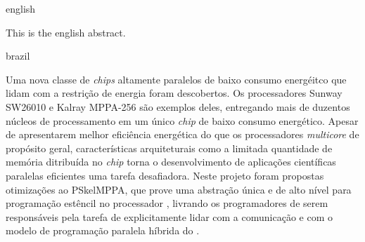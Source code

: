 \swapcontents
{
    \begin{otherlanguage*}{english}
    \begin{resumo}[Abstract]

        This is the english abstract.


    \end{resumo}
    \end{otherlanguage*}
}
{
    \begin{otherlanguage*}{brazil}
    \begin{resumo}[Resumo]

        Uma nova classe de \textit{chips} altamente paralelos de baixo consumo energéitco que lidam com a restrição de energia foram descobertos. Os processadores Sunway SW26010 e Kalray MPPA-256 são exemplos deles, entregando mais de duzentos núcleos de processamento em um único \textit{chip} de baixo consumo energético. Apesar de apresentarem melhor eficiência energética do que os processadores \textit{multicore} de propósito geral, características arquiteturais como a limitada quantidade de memória ditribuída no \textit{chip} torna o desenvolvimento de aplicações científicas paralelas eficientes uma tarefa desafiadora. Neste projeto foram propostas otimizações ao \fw PSkelMPPA, que prove uma abstração única e de alto nível para programação estêncil no processador \mppa, livrando os programadores de serem responsáveis pela tarefa de explicitamente lidar com a comunicação e com o modelo de programação paralela híbrida do \mppa.


    \end{resumo}
    \end{otherlanguage*}
}



